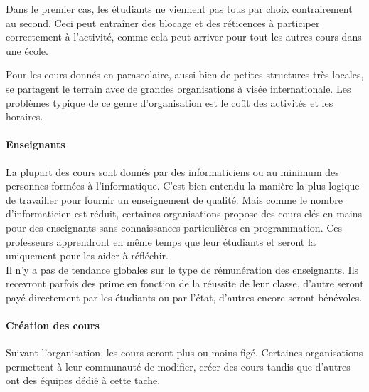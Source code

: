 Dans le premier cas, les étudiants ne viennent pas tous par choix contrairement au second. Ceci peut entraîner des blocage et des réticences à participer correctement à l'activité, comme cela peut arriver pour tout les autres cours dans une école.

Pour les cours donnés en parascolaire, aussi bien de petites structures très locales, se partagent le terrain avec de grandes organisations à visée internationale. Les problèmes typique de ce genre d'organisation est le coût des activités et les horaires.

\paragraph{Enseignants}
La plupart des cours sont donnés par des informaticiens ou au minimum des personnes formées à l'informatique. C'est bien entendu la manière la plus logique de travailler pour fournir un enseignement de qualité. Mais comme le nombre d'informaticien est réduit, certaines organisations propose des cours clés en mains pour des enseignants sans connaissances particulières en programmation. Ces professeurs apprendront en même temps que leur étudiants et seront la uniquement pour les aider à réfléchir.\\

Il n'y a pas de tendance globales sur le type de rémunération des enseignants. Ils recevront parfois des prime en fonction de la réussite de leur classe, d'autre seront payé directement par les étudiants ou par l'état, d'autres encore seront bénévoles.

\paragraph{Création des cours}
Suivant l'organisation, les cours seront plus ou moins figé. Certaines organisations permettent à leur communauté de modifier, créer des cours tandis que d'autres ont des équipes dédié à cette tache.

